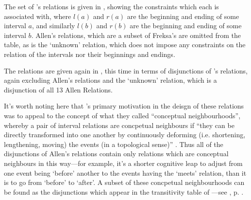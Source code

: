 \documentclass[a4paper,12pt,leqno]{article}
\begin{document}
The set of \citet{Freksa1992}'s relations is given in , showing the constraints which each is associated with, where $l(a)$ and $r(a)$ are the beginning and ending of some interval $a$, and similarly $l(b)$ and $r(b)$ are the beginning and ending of some interval $b$. Allen's relations, which are a subset of Freksa's are omitted from the table, as is the `unknown' relation, which does not impose any constraints on the relation of the intervals nor their beginnings and endings.

The relations are given again in , this time in terms of disjunctions of \citet{allen1983maintaining}'s relations, again excluding Allen's relations and the `unknown' relation, which is a disjunction of all 13 Allen Relations.

It's worth noting here that \citet{Freksa1992}'s primary motivation in the deisgn of these relations was to appeal to the concept of what they called ``conceptual neighbourhoods'', whereby a pair of interval relations are concpetual neighbours if ``they can be directly transformed into one another by continuously deforming (i.e. shortening, lengthening, moving) the events (in a topological sense)'' \citep[p. 206]{Freksa1992}. Thus all of the disjunctions of Allen's relations contain only relations which are conceptual neighbours in this way---for example, it's a shorter cognitive leap to adjust from one event being `before' another to the events having the `meets' relation, than it is to go from `before' to `after'. A subset of these concpetual neighbourhoods can be found as the disjunctions which appear in the transitivity table of \citet[p. 836]{allen1983maintaining}---see , p. \pageref{tab:allen-trans-table}.
\end{document}
